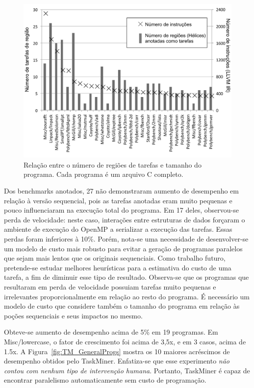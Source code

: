 \documentclass[sigconf]{acmart}
\newcommand\Taskminer{\mbox{\textsf{TaskMiner}}}
\begin{document}
\begin{figure}[htb]
\begin{center}
\includegraphics[width=1\columnwidth]{images/TM_Versatility}
\caption{Relação entre o número de regiões de tarefas e tamanho do programa.
Cada programa é um arquivo C completo.}
\label{fig:TM_Versatility}
\end{center}
\end{figure}

Dos benchmarks anotados, 27 não demonstraram aumento de desempenho em 
relação à versão sequencial,
pois as tarefas anotadas eram muito pequenas e pouco influenciaram na execução total do programa.
Em 17 deles, observou-se perda de velocidade: neste caso, interações entre estruturas de dados
forçaram o ambiente de execução do OpenMP a serializar a execução das tarefas. 
Essas perdas foram 
inferiores à 10\%. Porém, nota-se uma necessidade de desenvolver-se um modelo de custo mais robusto para evitar a geração de programas paralelos que sejam mais lentos que os originais sequenciais. Como trabalho futuro, pretende-se estudar melhores heurísticas para a estimativa do custo de uma tarefa, a fim de diminuir esse tipo de resultado. Observa-se que os programas que resultaram em perda de velocidade possuiam tarefas muito pequenas e irrelevantes proporcionalmente em relação ao resto do programa. É necessário um modelo de custo que considere também o tamanho do programa em relação às poções sequenciais e seus impactos no mesmo.

Obteve-se aumento de desempenho acima de 5\% em 19 programas. 
Em \textsf{Misc/lowercase}, o fator de crescimento foi acima de 3,5x, e em 3 casos, acima de 1.5x.
A Figura~\ref{fig:TM_GeneralProgs} mostra os 10 maiores acréscimos de desempenho obtidos pelo \Taskminer{}.
Enfatiza-se que esse experimento {\em não contou com nenhum tipo de intervenção humana}.
Portanto, \Taskminer{} é capaz de encontrar paralelismo automaticamente sem custo de programação.
\end{document}
